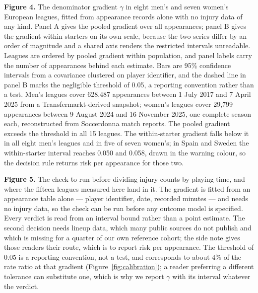 \documentclass[11pt]{article}
\begin{document}
\vspace{0.6em}

\noindent\textbf{Figure 4.} The denominator gradient $\gamma$ in eight men's and seven women's European leagues, fitted from appearance records alone with no injury data of any kind. Panel A gives the pooled gradient over all appearances; panel B gives the gradient within starters on its own scale, because the two series differ by an order of magnitude and a shared axis renders the restricted intervals unreadable. Leagues are ordered by pooled gradient within population, and panel labels carry the number of appearances behind each estimate. Bars are 95\% confidence intervals from a covariance clustered on player identifier, and the dashed line in panel B marks the negligible threshold of 0.05, a reporting convention rather than a test. Men's leagues cover 628,487 appearances between 1 July 2017 and 7 April 2025 from a Transfermarkt-derived snapshot; women's leagues cover 29,799 appearances between 9 August 2024 and 16 November 2025, one complete season each, reconstructed from Soccerdonna match reports. The pooled gradient exceeds the threshold in all 15 leagues. The within-starter gradient falls below it in all eight men's leagues and in five of seven women's; in Spain and Sweden the within-starter interval reaches 0.050 and 0.058, drawn in the warning colour, so the decision rule returns risk per appearance for those two.

\vspace{0.6em}

\noindent\textbf{Figure 5.} The check to run before dividing injury counts by playing time, and where the fifteen leagues measured here land in it. The gradient is fitted from an appearance table alone --- player identifier, date, recorded minutes --- and needs no injury data, so the check can be run before any outcome model is specified. Every verdict is read from an interval bound rather than a point estimate. The second decision needs lineup data, which many public sources do not publish and which is missing for a quarter of our own reference cohort; the side note gives those readers their route, which is to report risk per appearance. The threshold of 0.05 is a reporting convention, not a test, and corresponds to about 4\% of the rate ratio at that gradient (Figure~\ref{fig:calibration}); a reader preferring a different tolerance can substitute one, which is why we report $\gamma$ with its interval whatever the verdict.
\end{document}
